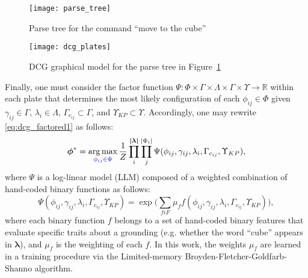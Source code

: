 \begin{figure}[b!]
\centering
\texttt{[image: parse\_tree]}
\caption{Parse tree for the command ``move to the cube''}
\label{fig:parse_tree}
\end{figure}

\begin{figure}[b!]
\centering
\texttt{[image: dcg\_plates]}
\caption{DCG graphical model for the parse tree in Figure~\ref{fig:parse_tree}}
\label{fig:dcg_plates}
\end{figure}

Finally, one must consider the factor function $\Psi : \Phi \times \Gamma \times \Lambda \times \Gamma \times \Upsilon \rightarrow
 \mathbb{R}$ within each plate that determines the most likely configuration of each $\phi_{ij} \in \Phi$ given $\gamma_{ij} \in \Gamma$, $\lambda_i \in \Lambda$, $\Gamma_{c_{ij}} \subset \Gamma$, and $\Upsilon_{KP} \subset \Upsilon$. Accordingly, one may rewrite \eqref{eq:dcg_factored1} as follows:
\begin{equation}
\boldsymbol{\phi}^* = \operatorname*{\arg\max}_{\textcolor{blue}{\phi_{ij} \in \Phi}} \frac{1}{Z} \prod_{i}^{\boldsymbol{|\lambda|}} \prod_{j}^{|\Phi_i|} \Psi(\phi_{ij},\gamma_{ij},\lambda_i,\Gamma_{c_{ij}},\Upsilon_{KP}),
\label{eq:llm1}
\end{equation}
where $\Psi$ is a log-linear model (LLM) composed of a weighted combination of hand-coded binary functions as follows:
\begin{equation}
\Psi(\phi_{ij},\gamma_{ij},\lambda_i,\Gamma_{c_{ij}},\Upsilon_{KP}) = \exp \Big( \sum_{f \epsilon F} \mu_f f(\phi_{ij},\gamma_{ij},\lambda_i,\Gamma_{c_{ij}},\Upsilon_{KP}) \Big),
\label{eq:llm2}
\end{equation}
where each binary function $f$ belongs to a set of hand-coded binary features that evaluate specific traits about a grounding (e.g. whether the word ``cube'' appears in $\boldsymbol{\lambda}$), and $\mu_f$ is the weighting of each $f$. In this work,
the weights $\mu_f$ are learned in a training procedure via the Limited-memory Broyden-Fletcher-Goldfarb-Shanno algorithm.%